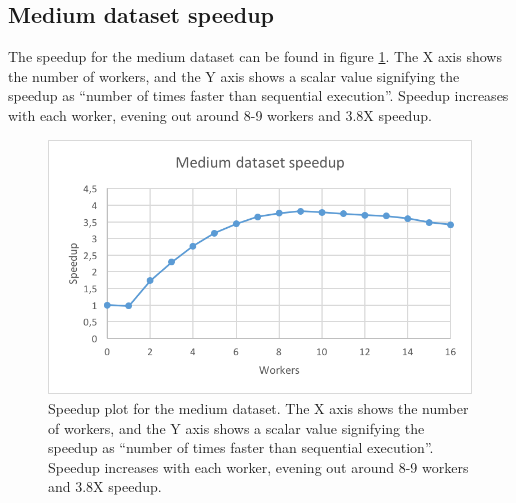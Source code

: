 \subsection{Medium dataset speedup}
The speedup for the medium dataset can be found in figure \ref{fig:dataset_3_speedup}.
The X axis shows the number of workers, and the Y axis shows a scalar value signifying the speedup as
``number of times faster than sequential execution''. Speedup increases with each worker, evening out around 8-9 workers and 3.8X speedup.
\begin{figure}[ht]
  \centering
  \includegraphics[width=120mm]{figures/dataset_3/dataset_3_speedup.png}
  \caption[Speedup plot for the medium dataset.]{Speedup plot for the medium dataset. The X axis shows the number of workers, and the Y axis shows a scalar value signifying the speedup as
  ``number of times faster than sequential execution''. Speedup increases with each worker, evening out around 8-9 workers and 3.8X speedup.}
  \label{fig:dataset_3_speedup}
\end{figure}

